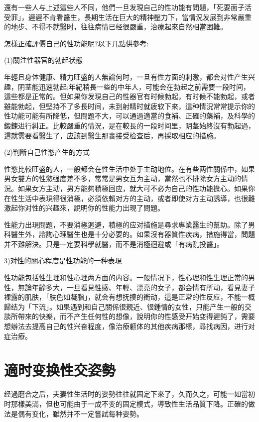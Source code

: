 \documentclass[12pt,UTF8]{ctexbook}
\begin{document}
還有一些人与上述這些人不同，他們一旦发現自己的性功能有問題，「死要面子活受罪」，遲遲不肯看醫生，長期生活在巨大的精神壓力下，當情況发展到非常嚴重的地步、不得不就醫时，往往病情已经很嚴重，治療起來自然相當困難。

怎樣正確評價自己的性功能呢?以下几點供參考:

(1)關注性器官的勃起状態

年輕且身体健康、精力旺盛的人無論何时，一旦有性方面的刺激，都会对性产生兴趣，阴茎能迅速勃起;年紀稍長一些的中年人，可能会在勃起之前需要一段时间，這些都是正常的。但如果你发現自己的性器官有时候勃起，有时候不能勃起，或者雖能勃起，但堅持不了多長时间，未到射精时就疲软下來，這种情況常常提示你的性功能可能有所降低，但問題不大，可以通過適當的食補、正確的藥補，及科學的鍛鍊进行糾正。比較嚴重的情況，是在較長的一段时间里，阴茎始終沒有勃起過，這就需要看醫生了，应該到醫生那裹接受检查后，再採取相应的措施。

(2)判斷自己性慾产生的方式

性慾比較旺盛的人，一般都会在性生活中处于主动地位。在有些两性關係中，如果男女雙方的性慾强度差不多，常常是男女互为主动，當然也不排除女方主动的情況。如果女方主动，男方能夠積極回应，就大可不必为自己的性功能擔心。如果你在性生活中表現得很消極，必須依賴对方的主动，或者即使对方主动誘導，也很難激起你对性的兴趣來，說明你的性能力出現了問題。

性能力出現問題，不要消極迥避，積極的应对措施是尋求專業醫生的幫助。除了男科醫生外，諮詢心理醫生也是十分必要的。如果沒有器質性疾病，措施得當，問題并不難解決。只是一定要科學就醫，而不是消極迴避或「有病亂投醫」。

3)对性的關心程度是性功能的一种表現

性功能包括性生理和性心理两方面的内容。一般情况下，性心理和性生理正常的男性，無論年齡多大，一旦看見性感、年輕、漂亮的女子，都会情有所动，看見妻子裸露的肌肤，「肤色如凝脂」，就会有想抚摸的衝动，這是正常的性反应，不能一概歸结为「下流」。如果遇到和自己關係很親近、很鍾情的女性，只能产生一般的交談所帶來的快樂，而不产生任何性的想像，說明你的性感受开始变得遲鈍了，需要想辦法去提高自己的性兴奋程度，像治療軀体的其他疾病那樣，尋找病因，进行对症治療。

\section{適时变换性交姿勢}

经過磨合之后，夫妻性生活时的姿勢往往就固定下來了，久而久之，可能一如當初时那樣美滿，但也可能由于一成不变的固定模式，導致性生活品質下降。正確的做法是偶有变化，雖然并不一定嘗試每种姿勢。
\end{document}
